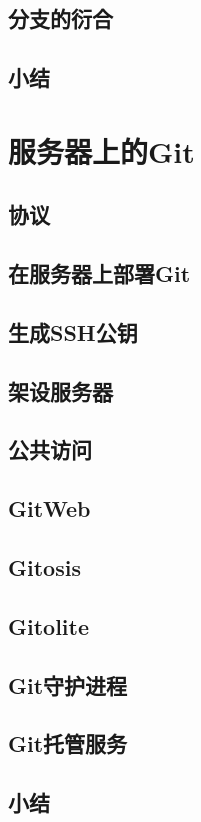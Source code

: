 \documentclass{book}
\begin{document}
	\section{分支的衍合}
	\section{小结}

\chapter{服务器上的Git}
	\section{协议}
	\section{在服务器上部署Git}
	\section{生成SSH公钥}
	\section{架设服务器}
	\section{公共访问}
	\section{GitWeb}
	\section{Gitosis}
	\section{Gitolite}
	\section{Git守护进程}
	\section{Git托管服务}
	\section{小结}
\end{document}
